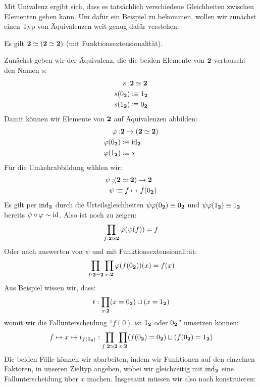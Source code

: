 Mit Univalenz ergibt sich, dass es tatsächlich verschiedene Gleichheiten zwischen Elementen geben kann.
Um dafür ein Beispiel zu bekommen, wollen wir zunächst einen Typ von Äquivalenzen weit genug dafür verstehen:
\begin{bemerkung}
  Es gilt $\mathbf{2}\simeq (\mathbf{2}\simeq \mathbf{2})$ (mit Funktionsextensionalität).
\end{bemerkung}
\begin{beweis}
  Zunächst geben wir der Äquivalenz, die die beiden Elemente von $\mathbf{2}$ vertauscht den Namen $s$:
  \begin{align*}
    s:&\mathbf{2}\simeq\mathbf{2} \\
    s(0_{\mathbf{2}})&\vcentcolon\mspace{-1.2mu}\equiv 1_{\mathbf{2}} \\
    s(1_{\mathbf{2}})&\vcentcolon\mspace{-1.2mu}\equiv 0_{\mathbf{2}}
  \end{align*}
  Damit können wir Elemente von $\mathbf{2}$ auf Äquivalenzen abbilden:
  \begin{align*}
    \varphi:&\mathbf{2}\to (\mathbf{2}\simeq\mathbf{2}) \\
    \varphi(0_{\mathbf{2}})&\vcentcolon\mspace{-1.2mu}\equiv \mathrm{id}_{\mathbf{2}} \\
    \varphi(1_{\mathbf{2}})&\vcentcolon\mspace{-1.2mu}\equiv s
  \end{align*}
  Für die Umkehrabbildung wählen wir:
  \begin{align*}
    \psi:&(\mathbf{2}\simeq\mathbf{2})\to\mathbf{2} \\
    \psi&\vcentcolon\mspace{-1.2mu}\equiv f\mapsto f(0_{\mathbf{2}}) \\
  \end{align*}
  Es gilt per $\mathrm{ind}_{\mathbf{2}}$ durch die Urteilsgleichheiten $\psi\varphi(0_{\mathbf{2}})\equiv 0_{\mathbf{2}}$ und $\psi\varphi(1_{\mathbf{2}})\equiv 1_{\mathbf{2}}$ bereits $\psi\circ\varphi\sim \mathrm{id}$.
  Also ist noch zu zeigen:
  \[
    \prod_{f:\mathbf{2}\simeq \mathbf{2}} \varphi(\psi(f))=f
  \]
  Oder nach auswerten von $\psi$ und mit Funktionsextensionalität:
  \[
    \prod_{f:\mathbf{2}\simeq \mathbf{2}}\prod_{x:\mathbf{2}} \varphi(f(0_{\mathbf{2}}))(x)=f(x)
  \]
  Aus Beispiel  wissen wir, dass:
  \[
    t:\prod_{x:\mathbf{2}}(x=0_{\mathbf{2}})\sqcup(x=1_{\mathbf{2}})
  \]
  womit wir die Fallunterscheidung ``$f(0)$ ist $1_{\mathbf{2}}$ oder $0_{\mathbf{2}}$'' umsetzen können:
  \[
    f\mapsto x\mapsto t_{f(0_{\mathbf{2}})} : \prod_{f:\mathbf{2}\simeq\mathbf{2}}\prod_{x:\mathbf{2}}(f(0_{\mathbf{2}})=0_{\mathbf{2}})\sqcup(f(0_{\mathbf{2}})=1_{\mathbf{2}})
  \]
  Die beiden Fälle können wir abarbeiten, indem wir Funktionen auf den einzelnen Faktoren, in unseren Zieltyp angeben, wobei wir gleichzeitig mit $\mathrm{ind}_{\mathbf{2}}$ eine Fallunterscheidung über $x$ machen.
  Insgesamt müssen wir also noch konstruieren:
  \begin{align*}

\end{align*}
\end{beweis}
